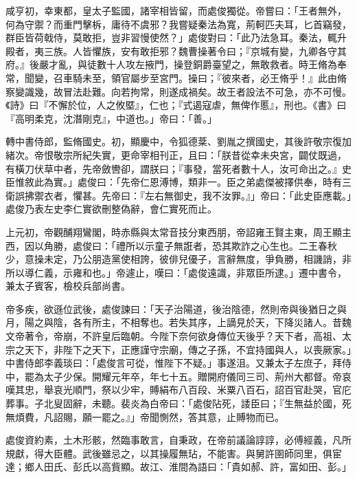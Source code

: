 \begin{pinyinscope}
 咸亨初，幸東都，皇太子監國，諸宰相皆留，而處俊獨從。帝嘗曰：「王者無外，何為守禦？而重門擊柝，庸待不虞邪？我嘗疑秦法為寬，荊軻匹夫耳，匕首竊發，群臣皆荷戟侍，莫敢拒，豈非習慢使然？」處俊對曰：「此乃法急耳。秦法，輒升殿者，夷三族。人皆懼族，安有敢拒邪？魏曹操著令曰；『京城有變，九卿各守其府。』後嚴才亂，與徒數十人攻左掖門，操登銅爵臺望之，無敢救者。時王脩為奉常，聞變，召車騎未至，領官屬步至宮門。操曰；『彼來者，必王脩乎！』此由脩察變識幾，故冒法赴難。向若拘常，則遂成禍矣。故王者設法不可急，亦不可慢。《詩》曰『不懈於位，人之攸塈』，仁也；『式遏寇虐，無俾作慝』，刑也。《書》曰『高明柔克，沈潛剛克』，中道也。」帝曰：「善。」



 轉中書侍郎，監脩國史。初，顯慶中，令狐德棻、劉胤之撰國史，其後許敬宗復加緒次。帝恨敬宗所紀失實，更命宰相刊正，且曰：「朕昔從幸未央宮，闢仗既過，有橫刀伏草中者，先帝斂轡卻，謂朕曰；『事發，當死者數十人，汝可命出之。』史臣惟敘此為實。」處俊曰：「先帝仁恩溥博，類非一。臣之弟處傑被擇供奉，時有三衛誤拂禦衣者，懼甚。先帝曰：『左右無御史，我不汝罪。』」帝曰：「此史臣應載。」處俊乃表左史李仁實欲刪整偽辭，會仁實死而止。



 上元初，帝觀酺翔鸞閣，時赤縣與太常音技分東西朋，帝詔雍王賢主東，周王顯主西，因以角勝，處俊曰：「禮所以示童子無誑者，恐其欺詐之心生也。二王春秋少，意操未定，乃公朋造黨使相誇，彼俳兒優子，言辭無度，爭負勝，相譏誚，非所以導仁義，示雍和也。」帝遽止，嘆曰：「處俊遠識，非眾臣所逮。」遷中書令，兼太子賓客，檢校兵部尚書。



 帝多疾，欲遜位武後，處俊諫曰：「天子治陽道，後治陰德，然則帝與後猶日之與月，陽之與陰，各有所主，不相奪也。若失其序，上謫見於天，下降災諸人。昔魏文帝著令，帝崩，不許皇后臨朝。今陛下奈何欲身傳位天後乎？天下者，高祖、太宗之天下，非陛下之天下，正應謹守宗廟，傳之子孫，不宜持國與人，以喪厥家。」中書侍郎李義琰曰：「處俊言可從，惟陛下不疑。」事遂沮。又兼太子左庶子，拜侍中，罷為太子少保。開耀元年卒，年七十五。贈開府儀同三司、荊州大都督。帝哀嘆其忠，舉哀光順門，祭以少牢，賻絹布八百段、米粟八百石，詔百官赴哭，官庀葬事。子北叟固辭，未聽。裴炎為白帝曰：「處俊阽死，諉臣曰；『生無益於國，死無煩費，凡詔賜，願一罷之。』」帝聞惻然，答其意，止賻物而已。



 處俊資約素，土木形骸，然臨事敢言，自秉政，在帝前議論諄諄，必傅經義，凡所規獻，得大臣體。武後雖忌之，以其操履無玷，不能害。與舅許圉師同里，俱宦達；鄉人田氏、彭氏以高貲顯。故江、淮間為語曰：「貴如郝、許，富如田、彭。」




\end{pinyinscope}
